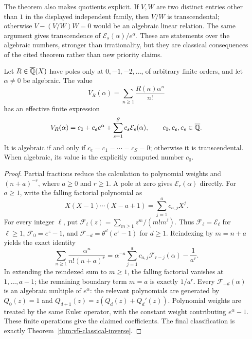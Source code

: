 The theorem also makes quotients explicit.  If $V,W$ are two distinct
entries other than $1$ in the displayed independent family, then
$V/W$ is transcendental; otherwise $V-(V/W)W=0$ would be an algebraic
linear relation.  The same argument gives transcendence of
$\mathcal E_s(\alpha)/e^\alpha$.  These are statements over the
algebraic numbers, stronger than irrationality, but they are classical
consequences of the cited theorem rather than new priority claims.

\begin{corollary}
\label{cor:v5-pure-rational-classification}
Let $R\in\overline{\mathbb Q}(X)$ have poles only at $0,-1,-2,\ldots$, of
arbitrary finite orders, and let $\alpha\ne0$ be algebraic.  The value
\[
 V_R(\alpha)=\sum_{n\geq1}\frac{R(n)\alpha^n}{n!}
\]
has an effective finite expression
\[
 V_R(\alpha)=c_0+c_e e^\alpha+
                \sum_{s=1}^S c_s\mathcal E_s(\alpha),
 \qquad c_0,c_e,c_s\in\overline{\mathbb Q}.
\]
It is algebraic if and only if $c_e=c_1=\cdots=c_S=0$; otherwise
it is transcendental.  When algebraic, its value is the explicitly
computed number $c_0$.
\end{corollary}
\begin{proof}
Partial fractions reduce the calculation to polynomial weights and
$(n+a)^{-r}$, where $a\geq0$ and $r\geq1$.  A pole at zero gives
$\mathcal E_r(\alpha)$ directly.  For $a\geq1$, write the falling
factorial polynomial as
\[
 X(X-1)\cdots(X-a+1)=\sum_{j=1}^a c_{a,j}X^j.
\]
For every integer $\ell$, put
$\mathcal F_\ell(z)=\sum_{m\geq1}z^m/(m!m^\ell)$.
Thus $\mathcal F_\ell=\mathcal E_\ell$ for $\ell\geq1$,
$\mathcal F_0=e^z-1$, and
$\mathcal F_{-d}=\theta^d(e^z-1)$ for $d\geq1$.
Reindexing by $m=n+a$ yields the exact identity
\begin{equation}
 \sum_{n\geq1}\frac{\alpha^n}{n!(n+a)^r}
 =\alpha^{-a}\sum_{j=1}^a c_{a,j}
                      \mathcal F_{r-j}(\alpha)-\frac1{a^r}.
 \label{eq:v5-all-poles-reduction}
\end{equation}
In extending the reindexed sum to $m\geq1$, the falling factorial
vanishes at $1,\ldots,a-1$; the remaining boundary term $m=a$
is exactly $1/a^r$.  Every $\mathcal F_{-d}(\alpha)$ is an algebraic
multiple of $e^\alpha$: the relevant polynomials are generated by
$Q_0(z)=1$ and $Q_{d+1}(z)=z(Q_d(z)+Q_d'(z))$.
Polynomial weights are treated by the same Euler operator, with the
constant weight contributing $e^\alpha-1$.
These finite operations give the claimed coefficients.  The final
classification is exactly Theorem~\ref{thm:v5-classical-inverse}.
\end{proof}

